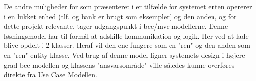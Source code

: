 De andre muligheder for  som præsenteret i \cite{umlbook} er tilfælde for systemet enten opererer i en lukket enhed (tlf. og bank er brugt som eksempler) og den anden, og for dette projekt relevante, tager udgangspunkt i bce/mvc-modellerne. Denne løsningsmodel har til formål at adskille kommunikation og logik. Her ved at lade  blive opdelt i 2 klasser. Heraf vil den ene fungere som en "ren"  og den anden som en "ren" entity-klasse. Ved brug af denne model ligner systemets design i højere grad bce-modellen og  klassens "ansvarsområde"  ville således kunne overføres direkte fra Use Case Modellen.        




